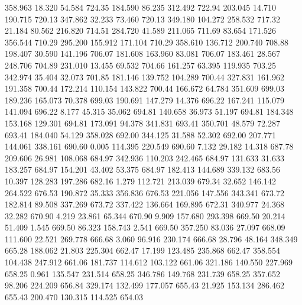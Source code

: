  358.963   18.320   54.584       724.35
 184.590   86.235  312.492       722.94
 203.045   14.710  190.715       720.13
 347.862   32.233   73.460       720.13
 349.180  104.272  258.532       717.32
  21.184   80.562  216.820       714.51
 284.720   41.589  211.065       711.69
  83.654  171.526  356.544       710.29
 295.200  155.912  171.104       710.29
 358.610  136.712  200.740       708.88
 198.407   30.590  141.196       706.07
 181.608  163.960   83.081       706.07
 183.461   28.567  248.706       704.89
 231.010   13.455   69.532       704.66
 161.257   63.395  119.935       703.25
 342.974   35.404   32.073       701.85
 181.146  139.752  104.289       700.44
 327.831  161.962  191.358       700.44
 172.214  110.154  143.822       700.44
 166.672   64.784  351.609       699.03
 189.236  165.073   70.378       699.03
 190.691  147.279   14.376       696.22
 167.241  115.079  141.094       696.22
   8.177   45.315   35.062       694.81
 140.658   36.973   51.197       694.81
 184.348  153.168  129.301       694.81
 173.091   94.378  341.831       693.41
 350.701   48.579   72.287       693.41
 184.040   54.129  358.028       692.00
 344.125   31.588   52.302       692.00
 207.771  144.061  338.161       690.60
   0.005  114.395  220.549       690.60
   7.132   29.182   14.318       687.78
 209.606   26.981  108.068       684.97
 342.936  110.203  242.465       684.97
 131.633   31.633  183.257       684.97
 154.201   43.402   53.375       684.97
 182.413  144.689  339.132       683.56
  10.397  128.283  197.286       682.16
   1.279  112.721  213.039       679.34
  32.652  146.142  264.522       676.53
 190.872   35.333  356.836       676.53
 221.056  147.556  343.341       673.72
 182.814   89.508  337.269       673.72
 337.422  136.664  169.895       672.31
 340.977   24.368   32.282       670.90
   4.219   23.861   65.344       670.90
   9.909  157.680  293.398       669.50
  20.214   51.409    1.545       669.50
  86.323  158.743    2.541       669.50
 357.250   83.036   27.097       668.09
 111.600   22.521  269.778       666.68
   3.060   96.916  230.174       666.68
  28.796   48.164  348.349       665.28
 188.062   21.803  225.304       662.47
  17.199  123.485  235.868       662.47
 358.554  104.438  247.912       661.06
 181.737  114.612  103.122       661.06
 321.186  140.550  227.969       658.25
   0.961  135.547  231.514       658.25
 346.786  149.768  231.739       658.25
 357.652   98.206  224.209       656.84
 329.174  132.499  177.057       655.43
  21.925  153.134  286.462       655.43
 200.470  130.315  114.525       654.03
